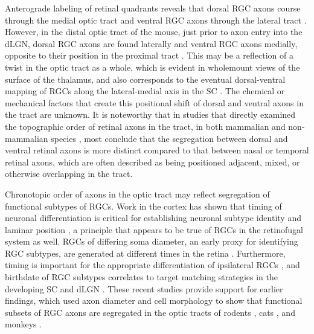 Anterograde labeling of retinal quadrants reveals that dorsal RGC axons course through the medial optic tract and ventral RGC axons through the lateral tract \cite{chan1999changes,chan1994changes,plas2005pretarget,reese1993reestablishment,reese1990fibre,reh1983organization}.
However, in the distal optic tract of the mouse, just prior to axon entry into the dLGN, dorsal RGC axons are found laterally and ventral RGC axons medially, opposite to their position in the proximal tract \cite{plas2005pretarget}. %
This may be a reflection of a twist in the optic tract as a whole, which is evident in wholemount views of the surface of the thalamus, and also corresponds to the eventual dorsal-ventral mapping of RGCs along the lateral-medial axis in the SC \cite{plas2005pretarget}.
The chemical or mechanical factors that create this positional shift of dorsal and ventral axons in the tract are unknown.
It is noteworthy that in studies that directly examined the topographic order of retinal axons in the tract, in both mammalian \cite{chan1994changes,plas2005pretarget,reese1993reestablishment} and non-mammalian species \cite{ehrlich1984course,montgomery1998organization,reh1983organization,thanos1983investigations}, most conclude that the segregation between dorsal and ventral retinal axons is more distinct compared to that between nasal or temporal retinal axons, which are often described as being positioned adjacent, mixed, or otherwise overlapping in the tract.



Chronotopic order of axons in the optic tract may reflect segregation of functional subtypes of RGCs.
Work in the cortex has shown that timing of neuronal differentiation is critical for establishing neuronal subtype identity and laminar position \cite{molyneaux2007neuronal}, a principle that appears to be true of RGCs in the retinofugal system as well.
RGCs of differing soma diameter, an early proxy for identifying RGC subtypes, are generated at different times in the retina \cite{rapaport1995spatiotemporal,reese1994birthdates}.
Furthermore, timing is important for the appropriate differentiation of ipsilateral RGCs \cite{bhansali2014delayed}, and birthdate of RGC subtypes correlates to target matching strategies in the developing SC and dLGN \cite{osterhout2014birthdate}.
These recent studies provide support for earlier findings, which used axon diameter and cell morphology to show that functional subsets of RGC axons are segregated in the optic tracts of rodents \cite{reese1987distributionrat}, cats \cite{guillery1982arrangement,torrealba1982studies}, and monkeys \cite{reese1990fibre}.

